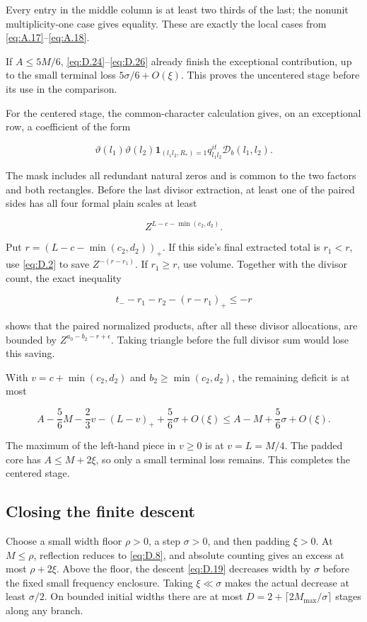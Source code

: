 \documentclass[11pt,a4paper]{article}
\begin{document}
Every entry in the middle column is at least two thirds of the last; the nonunit multiplicity-one case gives equality. These are exactly the local cases from \eqref{eq:A.17}--\eqref{eq:A.18}.

If \(A\le5M/6\), \eqref{eq:D.24}--\eqref{eq:D.26} already finish the exceptional contribution, up to the small terminal loss \(5\sigma/6+O(\xi)\). This proves the uncentered stage before its use in the comparison.

For the centered stage, the common-character calculation gives, on an exceptional row, a coefficient of the form

\[
\vartheta(l_1)\vartheta(l_2)\mathbf1_{(l_1l_2,R_*)=1}q_{l_1l_2}^{it}\mathcal D_b(l_1,l_2).
\tag{D.27}\label{eq:D.27}
\]

The mask includes all redundant natural zeros and is common to the two factors and both rectangles. Before the last divisor extraction, at least one of the paired sides has all four formal plain scales at least

\[
Z^{L-c-\min(c_2,d_2)}.
\]

Put \(r=(L-c-\min(c_2,d_2))_+\). If this side's final extracted total is \(r_1<r\), use \eqref{eq:D.2} to save \(Z^{-(r-r_1)}\). If \(r_1\ge r\), use volume. Together with the divisor count, the exact inequality

\[
t_--r_1-r_2-(r-r_1)_+\le-r
\tag{D.28}\label{eq:D.28}
\]

shows that the paired normalized products, after all these divisor allocations, are bounded by \(Z^{a_0-b_2-r+\epsilon}\). Taking triangle before the full divisor sum would lose this saving.

With \(v=c+\min(c_2,d_2)\) and \(b_2\ge\min(c_2,d_2)\), the remaining deficit is at most

\[
A-\frac56M-\frac23v-(L-v)_++\frac56\sigma+O(\xi)
\le A-M+\frac56\sigma+O(\xi).
\tag{D.29}\label{eq:D.29}
\]

The maximum of the left-hand piece in \(v\ge0\) is at \(v=L=M/4\). The padded core has \(A\le M+2\xi\), so only a small terminal loss remains. This completes the centered stage.

\subsection{Closing the finite descent}\label{sec:D.7}

Choose a small width floor \(\rho>0\), a step \(\sigma>0\), and then padding \(\xi>0\). At \(M\le\rho\), reflection reduces to \eqref{eq:D.8}, and absolute counting gives an excess at most \(\rho+2\xi\). Above the floor, the descent \eqref{eq:D.19} decreases width by \(\sigma\) before the fixed small frequency enclosure. Taking \(\xi\ll\sigma\) makes the actual decrease at least \(\sigma/2\). On bounded initial widths there are at most \(D=2+\lceil2M_{\max}/\sigma\rceil\) stages along any branch.
\end{document}
